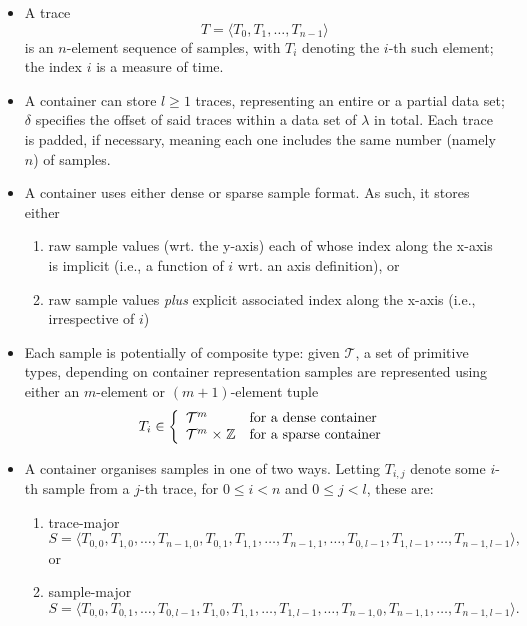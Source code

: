 \documentclass[10pt,a4paper]{llncs}
\begin{document}
\begin{itemize}
\item A trace 
      \[
      T = \langle T_0, T_1, \ldots, T_{n-1} \rangle
      \]
      is an $n$-element sequence of samples, with $T_i$ denoting the $i$-th 
      such element; the index $i$ is a measure of time.
\item A container can store $l \geq 1$ traces, representing an entire or a
      partial data set; $\delta$ specifies the offset of said traces within 
      a data set of $\lambda$ in total.  Each trace is padded, if necessary, 
      meaning each one includes the same number (namely $n$) of samples.
\item A container uses either dense or sparse sample format.  As such, it 
      stores either

      \begin{enumerate}      
      \item raw sample values (wrt. the y-axis) each of whose index along 
            the x-axis is implicit (i.e., a function of $i$ wrt. an axis 
            definition),
            or
      \item raw sample values {\em plus} explicit associated index along 
            the x-axis (i.e., irrespective of $i$)
      \end{enumerate}      

\item Each sample is potentially of composite type: given ${\mathcal T}$, a
      set of primitive types, depending on container representation samples
      are represented using either an $m$-element or $(m+1)$-element tuple
      \[
      T_i \in \left\{
              \begin{array}{c@{\;}c@{\;}cl}
              {\mathcal T}^m &      &             & \mbox{for a dense  container} \\
              {\mathcal T}^m &\times& {\mathbb Z} & \mbox{for a sparse container} \\
              \end{array}
              \right.
      \]
\item A container organises samples in one of two ways.  Letting $T_{i,j}$ 
      denote some $i$-th sample from a $j$-th trace, for $0 \leq i < n$ and 
      $0 \leq j < l$, these are:

      \begin{enumerate}
      \item trace-major 
            \[
            S = \langle T_{  0,  0}, T_{  1,  0}, \ldots, T_{n-1,  0},
                        T_{  0,  1}, T_{  1,  1}, \ldots, T_{n-1,  1},
                                                  \ldots,
                        T_{  0,l-1}, T_{  1,l-1}, \ldots, T_{n-1,l-1} \rangle ,
            \]
            or
      \item sample-major
            \[
            S = \langle T_{  0,  0}, T_{  0,  1}, \ldots, T_{  0,l-1},
                        T_{  1,  0}, T_{  1,  1}, \ldots, T_{  1,l-1},
                                                  \ldots,
                        T_{n-1,  0}, T_{n-1,  1}, \ldots, T_{n-1,l-1} \rangle .
            \]
      \end{enumerate}


\end{itemize}
\end{document}

